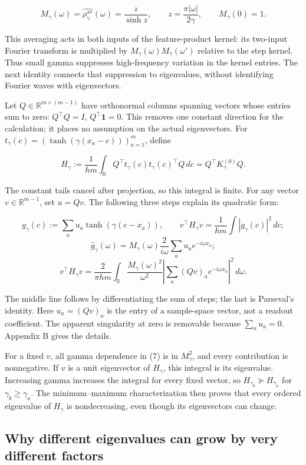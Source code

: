 \documentclass[11pt]{article}
\begin{document}
\[
M_\gamma(\omega)=\widehat{\rho_\gamma^{\mathrm{av}}}(\omega)
=\frac{z}{\sinh z},\qquad z=\frac{\pi|\omega|}{2\gamma},
\qquad M_\gamma(0)=1.
\tag{6}
\]

This averaging acts in both inputs of the feature-product kernel: its two-input Fourier transform is multiplied by \(M_\gamma(\omega)M_\gamma(\omega')\) relative to the step kernel. Thus small gamma suppresses high-frequency variation in the kernel entries. The next identity connects that suppression to eigenvalues, without identifying Fourier waves with eigenvectors.

Let \(Q\in\mathbb R^{m\times(m-1)}\) have orthonormal columns spanning vectors whose entries sum to zero: \(Q^\top Q=I\), \(Q^\top\mathbf1=0\). This removes one constant direction for the calculation; it places no assumption on the actual eigenvectors. For \(t_\gamma(c)=(\tanh(\gamma(x_a-c)))_{a=1}^{m}\), define

\[
H_\gamma:=\frac1{hm}\int_{\mathbb R}
Q^\top t_\gamma(c)t_\gamma(c)^\top Q\,dc
=Q^\top K_\gamma^{(0)}Q.
\]

The constant tails cancel after projection, so this integral is finite. For any vector \(v\in\mathbb R^{m-1}\), set \(u=Qv\). The following three steps explain its quadratic form:

\[
g_\gamma(c):=\sum_a u_a\tanh(\gamma(c-x_a)),
\qquad v^\top H_\gamma v=\frac1{hm}\int |g_\gamma(c)|^2\,dc;
\]
\[
\widehat g_\gamma(\omega)
=M_\gamma(\omega)\frac{2}{i\omega}
\sum_a u_a e^{-i\omega x_a};
\]
\[
\boxed{
v^\top H_\gamma v
=\frac2{\pi hm}\int_{\mathbb R}
\frac{M_\gamma(\omega)^2}{\omega^2}
\left|\sum_a (Qv)_a e^{-i\omega x_a}\right|^2\,d\omega.
}
\tag{7}
\]

The middle line follows by differentiating the sum of steps; the last is Parseval's identity. Here \(u_a=(Qv)_a\) is the entry of a sample-space vector, not a readout coefficient. The apparent singularity at zero is removable because \(\sum_a u_a=0\). Appendix B gives the details.

For a fixed \(v\), all gamma dependence in (7) is in \(M_\gamma^2\), and every contribution is nonnegative. If \(v\) is a unit eigenvector of \(H_\gamma\), this integral is its eigenvalue. Increasing gamma increases the integral for every fixed vector, so \(H_{\gamma_b}\succeq H_{\gamma_a}\) for \(\gamma_b\ge\gamma_a\). The minimum--maximum characterization then proves that every ordered eigenvalue of \(H_\gamma\) is nondecreasing, even though its eigenvectors can change.

\subsection{Why different eigenvalues can grow by very different factors}
\end{document}
